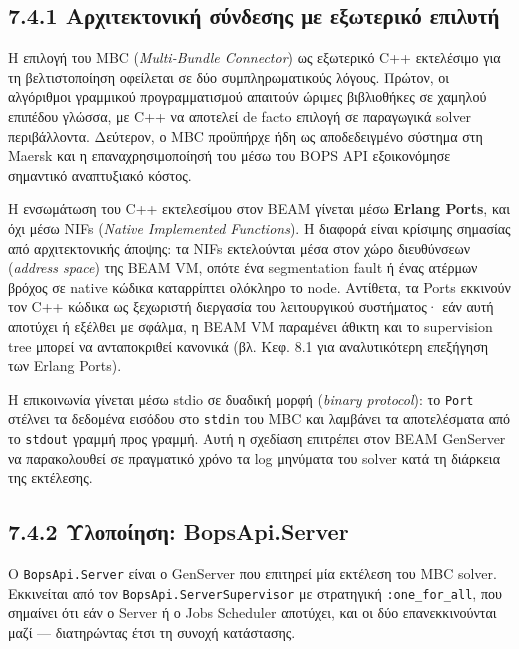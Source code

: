\subsection{7.4.1 Αρχιτεκτονική σύνδεσης με εξωτερικό
επιλυτή}\label{ux3b1ux3c1ux3c7ux3b9ux3c4ux3b5ux3baux3c4ux3bfux3bdux3b9ux3baux3ae-ux3c3ux3cdux3bdux3b4ux3b5ux3c3ux3b7ux3c2-ux3bcux3b5-ux3b5ux3beux3c9ux3c4ux3b5ux3c1ux3b9ux3baux3cc-ux3b5ux3c0ux3b9ux3bbux3c5ux3c4ux3ae}

Η επιλογή του MBC (\emph{Multi-Bundle Connector}) ως εξωτερικό C++
εκτελέσιμο για τη βελτιστοποίηση οφείλεται σε δύο συμπληρωματικούς
λόγους. Πρώτον, οι αλγόριθμοι γραμμικού προγραμματισμού απαιτούν ώριμες
βιβλιοθήκες σε χαμηλού επιπέδου γλώσσα, με C++ να αποτελεί de facto
επιλογή σε παραγωγικά solver περιβάλλοντα. Δεύτερον, ο MBC προϋπήρχε ήδη
ως αποδεδειγμένο σύστημα στη Maersk και η επαναχρησιμοποίησή του μέσω
του BOPS API εξοικονόμησε σημαντικό αναπτυξιακό κόστος.

Η ενσωμάτωση του C++ εκτελεσίμου στον BEAM γίνεται μέσω \textbf{Erlang
Ports}, και όχι μέσω NIFs (\emph{Native Implemented Functions}). Η
διαφορά είναι κρίσιμης σημασίας από αρχιτεκτονικής άποψης: τα NIFs
εκτελούνται μέσα στον χώρο διευθύνσεων (\emph{address space}) της BEAM
VM, οπότε ένα segmentation fault ή ένας ατέρμων βρόχος σε native κώδικα
καταρρίπτει ολόκληρο το node. Αντίθετα, τα Ports εκκινούν τον C++ κώδικα
ως ξεχωριστή διεργασία του λειτουργικού συστήματος· εάν αυτή αποτύχει ή
εξέλθει με σφάλμα, η BEAM VM παραμένει άθικτη και το supervision tree
μπορεί να ανταποκριθεί κανονικά (βλ. Κεφ. 8.1 για αναλυτικότερη
επεξήγηση των Erlang Ports).

Η επικοινωνία γίνεται μέσω stdio σε δυαδική μορφή (\emph{binary
protocol}): το \texttt{Port} στέλνει τα δεδομένα εισόδου στο
\texttt{stdin} του MBC και λαμβάνει τα αποτελέσματα από το
\texttt{stdout} γραμμή προς γραμμή. Αυτή η σχεδίαση επιτρέπει στον BEAM
GenServer να παρακολουθεί σε πραγματικό χρόνο τα log μηνύματα του solver
κατά τη διάρκεια της εκτέλεσης.

\subsection{7.4.2 Υλοποίηση:
BopsApi.Server}\label{ux3c5ux3bbux3bfux3c0ux3bfux3afux3b7ux3c3ux3b7-bopsapi.server}

Ο \texttt{BopsApi.Server} είναι ο GenServer που επιτηρεί μία εκτέλεση
του MBC solver. Εκκινείται από τον \texttt{BopsApi.ServerSupervisor} με
στρατηγική \texttt{:one\_for\_all}, που σημαίνει ότι εάν ο Server ή ο
Jobs Scheduler αποτύχει, και οι δύο επανεκκινούνται μαζί --- διατηρώντας
έτσι τη συνοχή κατάστασης.

